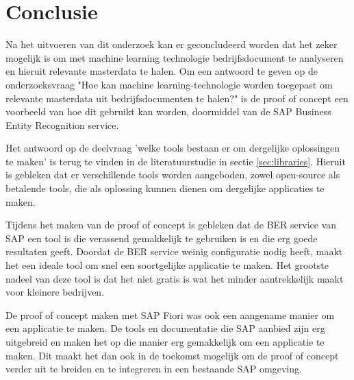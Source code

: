 
\chapter{Conclusie}%
\label{ch:conclusie}


Na het uitvoeren van dit onderzoek kan er geconcludeerd worden dat het zeker mogelijk is om met machine learning technologie bedrijfsdocument te analyseren en hieruit relevante masterdata te halen. Om een antwoord te geven op de onderzoeksvraag "Hoe kan machine learning-technologie worden toegepast om relevante masterdata uit bedrijfsdocumenten te halen?" is de proof of concept een voorbeeld van hoe dit gebruikt kan worden, doormiddel van de SAP Business Entity Recognition service.

Het antwoord op de deelvraag 'welke tools bestaan er om dergelijke oplossingen te maken' is terug te vinden in de literatuurstudie in sectie \ref{sec:libraries}. Hieruit is gebleken dat er verschillende tools worden aangeboden, zowel open-source als betalende tools, die als oplossing kunnen dienen om dergelijke applicaties te maken. 

Tijdens het maken van de proof of concept is gebleken dat de BER service van SAP een tool is die verassend gemakkelijk te gebruiken is en die erg goede resultaten geeft. Doordat de BER service weinig configuratie nodig heeft, maakt het een ideale tool om snel een soortgelijke applicatie te maken. Het grootste nadeel van deze tool is dat het niet gratis is wat het minder aantrekkelijk maakt voor kleinere bedrijven.

De proof of concept maken met SAP Fiori was ook een aangename manier om een applicatie te maken. De tools en documentatie die SAP aanbied zijn erg uitgebreid en maken het op die manier erg gemakkelijk om een applicatie te maken. Dit maakt het dan ook in de toekomst mogelijk om de proof of concept verder uit te breiden en te integreren in een bestaande SAP omgeving.